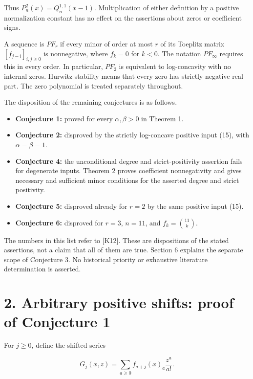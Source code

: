 \documentclass[11pt]{article}
\providecommand{\tightlist}{\setlength{\itemsep}{0pt}\setlength{\parskip}{0pt}}
\begin{document}
Thus \(P_n^2(x)=Q_n^{1,1}(x-1)\). Multiplication of either definition by
a positive normalization constant has no effect on the assertions about
zeros or coefficient signs.

A sequence is \(PF_r\) if every minor of order at most \(r\) of its
Toeplitz matrix \([f_{j-i}]_{i,j\ge0}\) is nonnegative, where \(f_k=0\)
for \(k<0\). The notation \(PF_\infty\) requires this in every order. In
particular, \(PF_2\) is equivalent to log-concavity with no internal
zeros. Hurwitz stability means that every zero has strictly negative
real part. The zero polynomial is treated separately throughout.

The disposition of the remaining conjectures is as follows.

\begin{itemize}
\tightlist
\item
  \textbf{Conjecture 1:} proved for every \(\alpha,\beta>0\) in Theorem
  1.
\item
  \textbf{Conjecture 2:} disproved by the strictly log-concave positive
  input (15), with \(\alpha=\beta=1\).
\item
  \textbf{Conjecture 4:} the unconditional degree and strict-positivity
  assertion fails for degenerate inputs. Theorem 2 proves coefficient
  nonnegativity and gives necessary and sufficient minor conditions for
  the asserted degree and strict positivity.
\item
  \textbf{Conjecture 5:} disproved already for \(r=2\) by the same
  positive input (15).
\item
  \textbf{Conjecture 6:} disproved for \(r=3\), \(n=11\), and
  \(f_k=\binom{11}{k}\).
\end{itemize}

The numbers in this list refer to {[}K12{]}. These are dispositions of
the stated assertions, not a claim that all of them are true. Section 6
explains the separate scope of Conjecture 3. No historical priority or
exhaustive literature determination is asserted.

\section{2. Arbitrary positive shifts: proof of Conjecture
1}\label{arbitrary-positive-shifts-proof-of-conjecture-1}

For \(j\ge0\), define the shifted series

\[
G_j(x,z)=\sum_{a\ge0}f_{a+j}(x)_a\frac{z^a}{a!}.
\]
\end{document}
